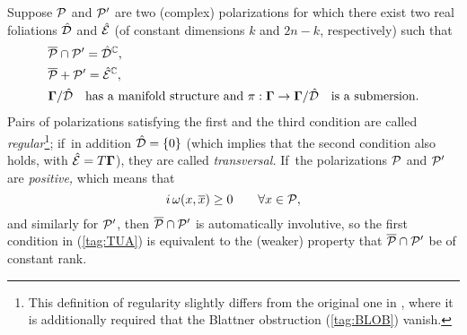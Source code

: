 \documentclass[11pt]{amsart}
\numberwithin{equation}{section}
\theoremstyle{remark}
\newcommand\Omg{{\bigam}}   %
\newcommand\PP{{\Cal P}}
\newcommand\DD{{\Cal D}}
\newcommand\EE{{\Cal E}}
\newcommand\GG{{\PP'}}
\newcommand\hatDD{{\hat\DD}}
\newcommand\hatEE{\hat\EE}
\newcommand{\CC}{\C}
\newcommand{\bigam}{\mbox{\boldmath $\Gamma$}}
\newcommand{\C}{\mathbb C}
\begin{document}
Suppose $\PP$ and $\GG$ are two (complex) polarizations for which there exist
two real foliations $\hatDD$ and $\hatEE$ (of constant dimensions $k$ and
$2n-k$, respectively) such that
\begin{equation}  \begin{aligned}
& \overline\PP\cap\GG = \hatDD^\CC, \\
& \overline\PP+\GG = \hatEE^\CC,  \\
& \Omg/\hatDD\text{ has a manifold structure and }\pi:\Omg\to \Omg/\hatDD\text{
is a submersion.}   \end{aligned}  \label{tag:TUA}  \end{equation}
Pairs of polarizations satisfying the first and the third condition are called
{\sl regular\/}\footnote{This definition of regularity slightly differs from
the original one in \cite{bib:BlattLN}, where it is additionally required that
the Blattner obstruction (\ref{tag:BLOB}) vanish.}; if~in addition
$\hatDD=\{0\}$ (which implies that the second condition also holds, with
$\hatEE=T\Omg$), they are called {\sl transversal.\/} If~the polarizations
$\PP$ and $\GG$ are {\sl positive,\/} which means that
\begin{equation}  i\,\omega(x,\overline x)\ge0  \qquad\forall x\in\PP,
\label{tag:POSIT}  \end{equation}
and similarly for $\GG$, then $\overline\PP\cap\GG$ is automatically
involutive, so the first condition in (\ref{tag:TUA}) is equivalent to the
(weaker) property that $\overline\PP\cap\GG$ be of constant rank.
\end{document}
